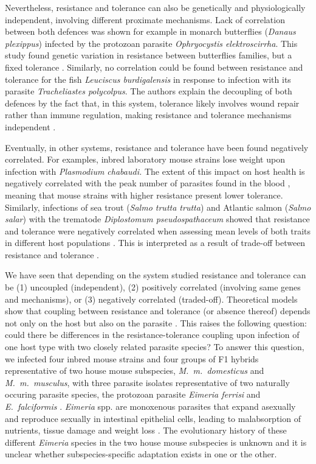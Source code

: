 \documentclass[12pt]{article}
\begin{document}
Nevertheless, resistance and tolerance can also be genetically and physiologically independent, involving different proximate mechanisms. Lack of correlation between both defences was shown for example in monarch butterflies (\textit{Danaus plexippus}) infected by the protozoan parasite \textit{Ophryocystis elektroscirrha}. This study found genetic variation in resistance between butterflies families, but a fixed tolerance \citep{Lefvre2010}. Similarly, no correlation could be found between resistance and tolerance for the fish \textit{Leuciscus burdigalensis} in response to infection with its parasite \textit{Tracheliastes polycolpus}. The authors explain the decoupling of both defences by the fact that, in this system, tolerance likely involves wound repair rather than immune regulation, making resistance and tolerance mechanisms independent \citep{MazGuilmo2014}.\par

Eventually, in other systems, resistance and tolerance have been found negatively correlated. For examples, inbred laboratory mouse strains lose weight upon infection with \textit{Plasmodium chabaudi.} The extent of this impact on host health is negatively correlated with the peak number of parasites found in the blood \citep{raaberg_disentangling_2007}, meaning that mouse strains with higher resistance present lower tolerance. Similarly, infections of sea trout (\textit{Salmo trutta trutta}) and Atlantic salmon (\textit{Salmo salar}) with the trematode \textit{Diplostomum pseudospathaceum} showed that resistance and tolerance were negatively correlated when assessing mean levels of both traits in different host populations \citep{klemme_vertebrate_2016}. This is interpreted as a result of trade-off between resistance and tolerance \citep{sheldon_ecological_1996, restif_concurrent_2004, raaberg_decomposing_2009}.\par

We have seen that depending on the system studied resistance and tolerance can be (1) uncoupled (independent), (2) positively correlated (involving same genes and mechanisms), or (3) negatively correlated (traded-off). Theoretical models show that coupling between resistance and tolerance (or absence thereof) depends not only on the host but also on the parasite \citep{Carval2010}. This raises the following question: could there be differences in the resistance-tolerance coupling upon infection of one host type with two closely related parasite species? To answer this question, we infected four inbred mouse strains and four groups of F1 hybrids representative of two house mouse subspecies, \textit{M.~m.~domesticus} and \textit{M.~m.~musculus}, with three parasite isolates representative of two naturally occuring parasite species, the protozoan parasite \textit{Eimeria ferrisi} and \textit{E.~falciformis }\citep{jarquin-diaz_detection_2019}. \textit{Eimeria }spp. are monoxenous parasites that expand asexually and reproduce sexually in intestinal epithelial cells, leading to malabsorption of nutrients, tissue damage and weight loss \citep{chapman_chapter_2013}. The evolutionary history of these different \textit{Eimeria} species in the two house mouse subspecies is unknown and it is unclear whether subspecies-specific adaptation exists in one or the other. 
\end{document}

